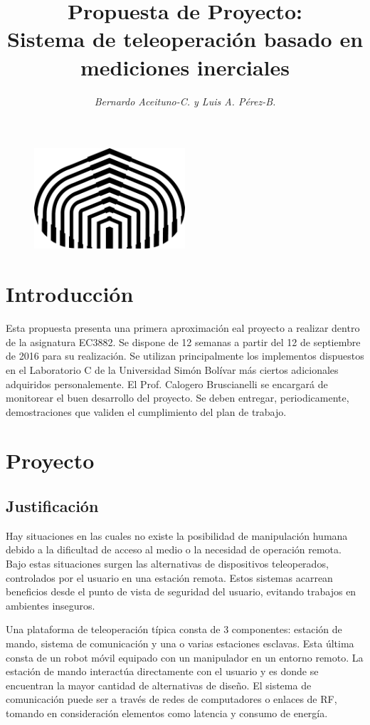 \documentclass{article}
\title{\textbf{Propuesta de Proyecto:} \\Sistema de teleoperación basado en mediciones inerciales}
\author{\textit{Bernardo Aceituno-C. y Luis A. Pérez-B.}}
\date{}
\begin{document}
\begin{figure}
	\centering
	\includegraphics[width=0.5\textwidth]{logo.png}
\end{figure}
\maketitle
\newpage
\section{Introducción}

Esta propuesta presenta una primera aproximación eal proyecto a realizar dentro de la asignatura EC3882. Se dispone de 12 semanas a partir del 12 de septiembre de 2016 para su realización. Se utilizan principalmente los implementos dispuestos en el Laboratorio C de la Universidad Simón Bolívar más ciertos adicionales adquiridos personalemente. El Prof. Calogero Bruscianelli se encargará de monitorear el buen desarrollo del proyecto. Se deben entregar, periodicamente, demostraciones que validen el cumplimiento del plan de trabajo.

\section{Proyecto}

\subsection{Justificación}

Hay situaciones en las cuales no existe la posibilidad de manipulación humana debido a la dificultad de acceso al medio o la necesidad de operación remota. Bajo estas situaciones surgen las alternativas de dispositivos teleoperados, controlados por el usuario en una estación remota. Estos sistemas acarrean beneficios desde el punto de vista de seguridad del usuario, evitando trabajos en ambientes inseguros.

Una plataforma de teleoperación típica consta de 3 componentes: estación de mando, sistema de comunicación y una o varias estaciones esclavas. Esta última consta de un robot móvil equipado con un manipulador en un entorno remoto. La estación de mando interactúa directamente con el usuario y es donde se encuentran la mayor cantidad de alternativas de diseño. El sistema de comunicación puede ser a través de redes de computadores o enlaces de RF, tomando en consideración elementos como latencia y consumo de energía.
\end{document}

